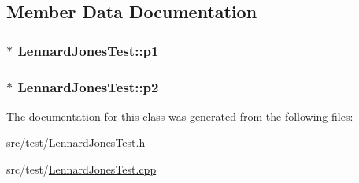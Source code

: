\subsection{Member Data Documentation}
\hypertarget{classLennardJonesTest_a1dc7b555324d73210a031ff3d672c366}{
\subsubsection[{p1}]{$\ast$ Lennard\+Jones\+Test\+::p1\hspace{0.3cm}{\ttfamily [private]}}}\label{classLennardJonesTest_a1dc7b555324d73210a031ff3d672c366}
\hypertarget{classLennardJonesTest_a3e7c82c522e5ef22eaa5cd0efb7866a8}{
\subsubsection[{p2}]{$\ast$ Lennard\+Jones\+Test\+::p2\hspace{0.3cm}{\ttfamily [private]}}}\label{classLennardJonesTest_a3e7c82c522e5ef22eaa5cd0efb7866a8}


The documentation for this class was generated from the following files\+:\begin{DoxyCompactItemize}
\item 
src/test/\hyperlink{LennardJonesTest_8h}{Lennard\+Jones\+Test.\+h}\item 
src/test/\hyperlink{LennardJonesTest_8cpp}{Lennard\+Jones\+Test.\+cpp}\end{DoxyCompactItemize}
